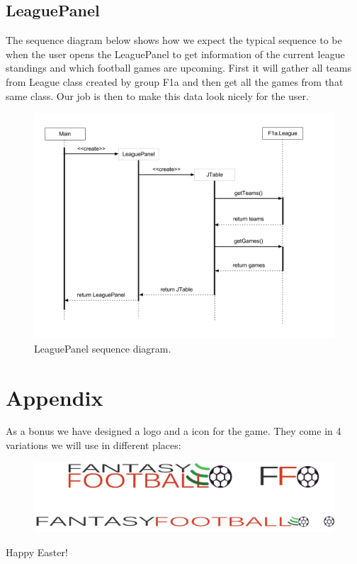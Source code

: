 \documentclass{article}
\begin{document}
\subsection{LeaguePanel}
The sequence diagram below shows how we expect the typical sequence to be when the user opens the LeaguePanel to get information of the current league standings and which football games are upcoming. First it will gather all teams from League class created by group F1a and then get all the games from that same class. Our job is then to make this data look nicely for the user.
\begin{figure}[H]
\centering
\includegraphics[width=\textwidth]{img/seq_diagram_2.png}
\caption{LeaguePanel sequence diagram.}
\end{figure}

\newpage
\section{Appendix}
As a bonus we have designed a logo and a icon for the game. They come in 4 variations we will use in different places:

\begin{figure}[H]
\centering
\includegraphics[width=\textwidth]{img/logos.png}
\end{figure}

Happy Easter!
\end{document}
